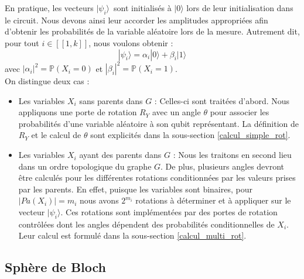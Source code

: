 En pratique, les vecteurs $|\psi_i\rangle$\footnotemark \ sont initialisés à $|0\rangle$ lors de leur initialisation dans le circuit. Nous devons ainsi leur accorder les amplitudes appropriées afin d'obtenir les probabilités de la variable aléatoire lors de la mesure. Autrement dit, pour tout $i\in[\![1,k]\!]$, nous voulons obtenir :
\[|\psi_i\rangle = \alpha_i|0\rangle + \beta_i|1\rangle\]
avec $|\alpha_i|^2 = \mathbb{P}(X_i=0)$ et $|\beta_i|^2 = \mathbb{P}(X_i=1)$.
\\
On distingue deux cas :
\begin{itemize}
\item Les variables $X_i$ sans parents dans $G$ : Celles-ci sont traitées d'abord. Nous appliquons une porte de rotation $R_Y$ avec un angle $\theta$ pour associer les probabilités d'une variable aléatoire à son qubit représentant. La définition de $R_Y$ et le calcul de $\theta$ sont explicités dans la sous-section \ref{calcul_simple_rot}.
\item Les variables $X_i$ ayant des parents dans $G$ : Nous les traitons en second lieu dans un ordre topologique du graphe $G$. De plus, plusieurs angles devront être calculés pour les différentes rotations conditionnées par les valeurs prises par les parents. En effet, puisque les variables sont binaires, pour $|Pa(X_i)|=m_i$ nous avons $2^{m_i}$ rotations à déterminer et à appliquer sur le vecteur $|\psi_i\rangle$. Ces rotations sont implémentées par des portes de rotation contrôlées dont les angles dépendent des probabilités conditionnelles de $X_i$. Leur calcul est formulé dans la sous-section \ref{calcul_multi_rot}.
\end{itemize}

\subsection{Sphère de Bloch}
\label{section_Bloch}

